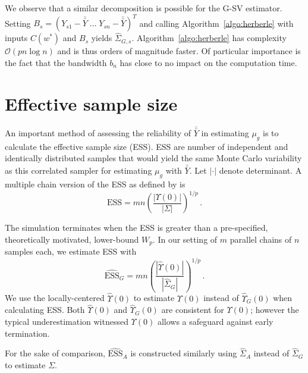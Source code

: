 \documentclass[11pt]{article}
\theoremstyle{remark}
\begin{document}
We observe that a similar decomposition is possible for the G-SV estimator. Setting $B_s = (Y_{s1} - \bar{\bar{Y}} \; \dots \; Y_{sn} - \bar{\bar{Y}})^T$ and calling Algorithm~\ref{algo:herberle} with inputs $C(w^*)$ and $B_s$ yields $\hat{\Sigma}_{G,s}$. Algorithm~\ref{algo:herberle} has complexity $\mathcal{O}(p n \log n)$ and is thus orders of magnitude faster. Of particular importance is the fact that the bandwidth $b_n$ has close to no impact on the computation time.

\section{Effective sample size} \label{sec:ess}

An important method of assessing the reliability of $\bar{\bar{Y}}$ in estimating $\mu_g$ is to calculate the effective sample size (ESS). ESS are number of independent and identically distributed samples that would yield the same Monte Carlo variability as this correlated sampler for estimating $\mu_g$ with $\bar{\bar{Y}}$. Let $|\cdot|$ denote determinant. A multiple chain version of the ESS as defined by \cite{vats:fleg:jon:2019} is
\[
\textrm{ESS} = mn \left(\dfrac{|\Upsilon(0)|}{|\Sigma|}\right)^{1/p}\, .
\]

The simulation terminates when the ESS is greater than a pre-specified, theoretically motivated, lower-bound $W_{p}$. 
%
In our setting of $m$ parallel chains of $n$ samples each, we
%
 estimate ESS with
\[
\widehat{\textrm{ESS}}_G = mn\left(\dfrac{|\hat{\Upsilon}(0)|}{|\hat{\Sigma}_{G}|}\right)^{1/p}\, .
\]
We use the locally-centered $\hat{\Upsilon}(0)$ to estimate $\Upsilon(0)$ instead of $\hat{\Upsilon}_G(0)$ when calculating ESS. Both $\hat{\Upsilon}(0)$ and $\hat{\Upsilon}_G(0)$ are consistent  for $\Upsilon(0)$; however the typical underestimation witnessed $\Upsilon(0)$ allows a safeguard against early termination.

For the sake of comparison, $\widehat{\textrm{ESS}}_A$ is constructed similarly using $\hat{\Sigma}_A$ instead of $\hat{\Sigma}_G$ to estimate $\Sigma$.  
\end{document}
